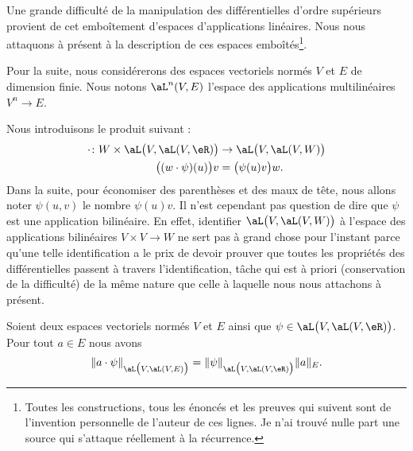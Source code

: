 Une grande difficulté de la manipulation des différentielles d'ordre supérieurs provient de cet emboîtement d'espaces d'applications linéaires. Nous nous attaquons à présent à la description de ces espaces emboîtés\footnote{Toutes les constructions, tous les énoncés et les preuves qui suivent sont de l'invention personnelle de l'auteur de ces lignes. Je n'ai trouvé nulle part une source qui s'attaque réellement à la récurrence.}.

Pour la suite, nous considérerons des espaces vectoriels normés \( V\) et \( E\) de dimension finie. Nous notons \( \aL^n(V,E)\) l'espace des applications multilinéaires \( V^n\to E\).

Nous introduisons le produit suivant\cite{MonCerveau} :
\begin{equation}
	\begin{aligned}
		\cdot\colon W\times \aL\big( V,\aL(V,\eR) \big) & \to \aL\big( V,\aL(V,W) \big) \\
		\big( (w\cdot \psi)(u) \big)v                   & =\big( \psi(u)v \big)w.
	\end{aligned}
\end{equation}
Dans la suite, pour économiser des parenthèses et des maux de tête, nous allons noter \( \psi(u,v)\) le nombre \( \psi(u)v\). Il n'est cependant pas question de dire que \( \psi\) est une application bilinéaire. En effet, identifier \( \aL\big( V,\aL(V,W) \big)\) à l'espace des applications bilinéaires \( V\times V\to W\) ne sert pas à grand chose pour l'instant parce qu'une telle identification a le prix de devoir prouver que toutes les propriétés des différentielles passent à travers l'identification, tâche qui est à priori (conservation de la difficulté) de la même nature que celle à laquelle nous nous attachons à présent.

\begin{lemma}        \label{LEMooHCUSooXYHuBR}
	Soient deux espaces vectoriels normés \( V\) et \( E\) ainsi que \( \psi\in\aL\big( V,\aL(V,\eR) \big)\). Pour tout \( a\in E\) nous avons
	\begin{equation}
		\| a\cdot \psi \|_{\aL\big( V,\aL(V,E) \big)}= \| \psi \|_{\aL\big( V,\aL(V,\eR) \big)}\| a \|_E.
	\end{equation}
\end{lemma}

